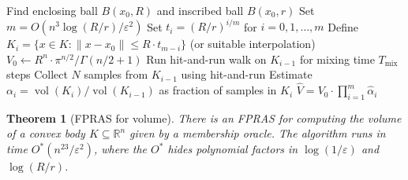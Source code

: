 \documentclass[twoside,12pt]{book}
\theoremstyle{plain}
\newtheorem{theorem}{Theorem}[chapter]
\theoremstyle{definition}
\theoremstyle{remark}
\begin{document}
\begin{algorithm}
\caption{Dyer--Frieze--Kannan Volume Estimation}
\label{alg:dfk}
\begin{algorithmic}[1]
    \State Find enclosing ball $B(x_0, R)$ and inscribed ball $B(x_0, r)$
    \State Set $m = O(n^3 \log(R/r) / \varepsilon^2)$ 
    \State Set $t_i = (R/r)^{i/m}$ for $i = 0, 1, \ldots, m$
    \State Define $K_i = \{x \in K : \|x - x_0\| \leq R \cdot t_{m-i}\}$ (or suitable interpolation)
    \State $V_0 \gets R^n \cdot \pi^{n/2} / \Gamma(n/2 + 1)$ 
        \State Run hit-and-run walk on $K_{i-1}$ for mixing time $T_{\text{mix}}$ steps
        \State Collect $N$ samples from $K_{i-1}$ using hit-and-run
        \State Estimate $\alpha_i = \operatorname{vol}(K_i)/\operatorname{vol}(K_{i-1})$ as fraction of samples in $K_i$
    \EndFor
    \State \Return $\hat{V} = V_0 \cdot \prod_{i=1}^m \hat{\alpha}_i$
\EndFunction
\end{algorithmic}
\end{algorithm}

\begin{theorem}[FPRAS for volume]
\label{thm:vol-fpras}
There is an FPRAS for computing the volume of a convex body $K \subseteq \mathbb{R}^n$ given by a membership oracle. The algorithm runs in time $O^*(n^{23} / \varepsilon^2)$, where the $O^*$ hides polynomial factors in $\log(1/\varepsilon)$ and $\log(R/r)$.
\end{theorem}
\end{document}
